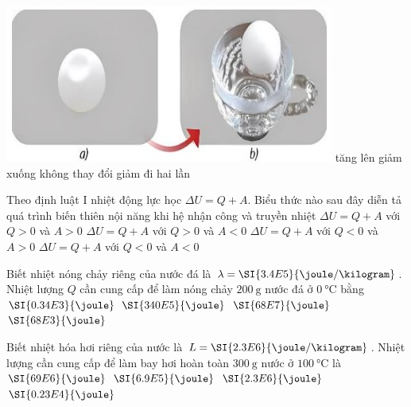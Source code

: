 \begin{ex}
	{\vspace{-0.5cm}\includegraphics[scale=0.5]{../figs/FINAL-SEM1-002-2}}
	\choice
	{\True tăng lên}
	{giảm xuống}
	{không thay đổi}
	{giảm đi hai lần}
	\loigiai{}
\end{ex}
\begin{ex}
	Theo định luật I nhiệt động lực học $\Delta U=Q+A$. Biểu thức nào sau đây diễn tả quá trình biến thiên nội năng khi hệ nhận công và truyền nhiệt
	\choice
	{$\Delta U=Q+A$ với $Q>0$ và $A>0$}
	{$\Delta U=Q+A$ với $Q>0$ và $A<0$}
	{\True $\Delta U=Q+A$ với $Q<0$ và $A>0$}
	{$\Delta U=Q+A$ với $Q<0$ và $A<0$}
	\loigiai{}
\end{ex}
\begin{ex}
	Biết nhiệt nóng chảy riêng của nước đá là $\lambda=\SI{3.4E5}{\joule/\kilogram}$. Nhiệt lượng $Q$ cần cung cấp để làm nóng chảy $\SI{200}{\gram}$ nước đá ở $\SI{0}{\celsius}$ bằng
	\choice
	{$\SI{0.34E3}{\joule}$}
	{$\SI{340E5}{\joule}$}
	{$\SI{68E7}{\joule}$}
	{\True $\SI{68E3}{\joule}$}
	\loigiai{}
\end{ex}
\begin{ex}
	Biết nhiệt hóa hơi riêng của nước là $L=\SI{2.3E6}{\joule/\kilogram}$. Nhiệt lượng cần cung cấp để làm bay hơi hoàn toàn $\SI{300}{\gram}$ nước ở $\SI{100}{\celsius}$ là 
	\choice
	{$\SI{69E6}{\joule}$}
	{\True $\SI{6.9E5}{\joule}$}
	{$\SI{2.3E6}{\joule}$}
	{$\SI{0.23E4}{\joule}$}
	\loigiai{}
\end{ex}
